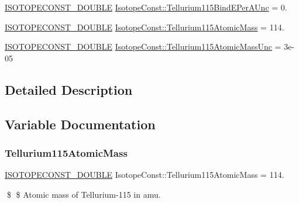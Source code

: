 \begin{DoxyCompactItemize}
\mbox{\hyperlink{group___isotope_const-_macros_ga8f45a7272ce02c0b4c65c44636ed719a}{I\+S\+O\+T\+O\+P\+E\+C\+O\+N\+S\+T\+\_\+\+D\+O\+U\+B\+LE}} \mbox{\hyperlink{group___isotope_const-_tellurium-_te115_gad918242a29cd0c8d9ee30cba35833f0c}{Isotope\+Const\+::\+Tellurium115\+Bind\+E\+Per\+A\+Unc}} = 0.
\item 
\mbox{\hyperlink{group___isotope_const-_macros_ga8f45a7272ce02c0b4c65c44636ed719a}{I\+S\+O\+T\+O\+P\+E\+C\+O\+N\+S\+T\+\_\+\+D\+O\+U\+B\+LE}} \mbox{\hyperlink{group___isotope_const-_tellurium-_te115_gab4ab4e2cc4a6e7e83066c5c38b018581}{Isotope\+Const\+::\+Tellurium115\+Atomic\+Mass}} = 114.
\item 
\mbox{\hyperlink{group___isotope_const-_macros_ga8f45a7272ce02c0b4c65c44636ed719a}{I\+S\+O\+T\+O\+P\+E\+C\+O\+N\+S\+T\+\_\+\+D\+O\+U\+B\+LE}} \mbox{\hyperlink{group___isotope_const-_tellurium-_te115_ga132b66499f148d1ea43d45ac577bb0ee}{Isotope\+Const\+::\+Tellurium115\+Atomic\+Mass\+Unc}} = 3e-\/05
\end{DoxyCompactItemize}


\subsection{Detailed Description}


\subsection{Variable Documentation}
\mbox{\label{group___isotope_const-_tellurium-_te115_gab4ab4e2cc4a6e7e83066c5c38b018581}} 
\subsubsection{\texorpdfstring{Tellurium115\+Atomic\+Mass}{Tellurium115AtomicMass}}
{\footnotesize\ttfamily \mbox{\hyperlink{group___isotope_const-_macros_ga8f45a7272ce02c0b4c65c44636ed719a}{I\+S\+O\+T\+O\+P\+E\+C\+O\+N\+S\+T\+\_\+\+D\+O\+U\+B\+LE}} Isotope\+Const\+::\+Tellurium115\+Atomic\+Mass = 114.}

\$ \$ Atomic mass of Tellurium-\/115 in amu. \mbox{\label{group___isotope_const-_tellurium-_te115_ga132b66499f148d1ea43d45ac577bb0ee}} 
